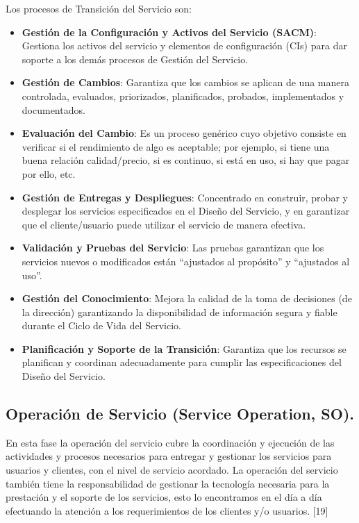 Los procesos de Transición del Servicio son:
\begin{itemize}
	\item \textbf{Gestión de la Configuración y Activos del Servicio (SACM)}: Gestiona los activos del servicio y elementos de configuración (CIs) para dar soporte a los demás procesos de Gestión del Servicio.
	\item	\textbf{Gestión de Cambios}: Garantiza que los cambios se aplican de una manera controlada,  evaluados, priorizados, planificados, probados, implementados y documentados. 
\item	\textbf{Evaluación del Cambio}: Es un proceso genérico cuyo objetivo consiste en verificar si el rendimiento de algo es aceptable; por ejemplo, si tiene una buena relación calidad/precio, si es continuo, si está en uso, si hay que pagar por ello, etc. 
	\item\textbf{	Gestión de Entregas y Despliegues}: Concentrado en construir, probar y desplegar los servicios especificados en el Diseño del Servicio, y en garantizar que el cliente/usuario puede utilizar el servicio de manera efectiva.
	\item\textbf{	Validación y Pruebas del Servicio}: Las pruebas garantizan que los servicios nuevos o modificados están “ajustados al propósito” y “ajustados al uso”. 
	\item	\textbf{Gestión del Conocimiento}: Mejora la calidad de la toma de decisiones (de la dirección) garantizando la disponibilidad de información segura y fiable durante el Ciclo de Vida del Servicio.
	\item\textbf{ Planificación y Soporte de la Transición}: Garantiza que los recursos se planifican y coordinan adecuadamente para cumplir las especificaciones del Diseño del Servicio.
	
\end{itemize}

\subsection{Operación de Servicio (Service Operation, SO).}

En esta fase la operación del servicio cubre la coordinación y ejecución de las actividades y procesos necesarios para entregar y gestionar los servicios para usuarios y clientes, con el nivel de servicio acordado. La operación del servicio también tiene la responsabilidad de gestionar la tecnología necesaria para la prestación y el soporte de los servicios, esto lo  encontramos en el día a día efectuando la atención a los requerimientos de los clientes y/o usuarios. [19]

